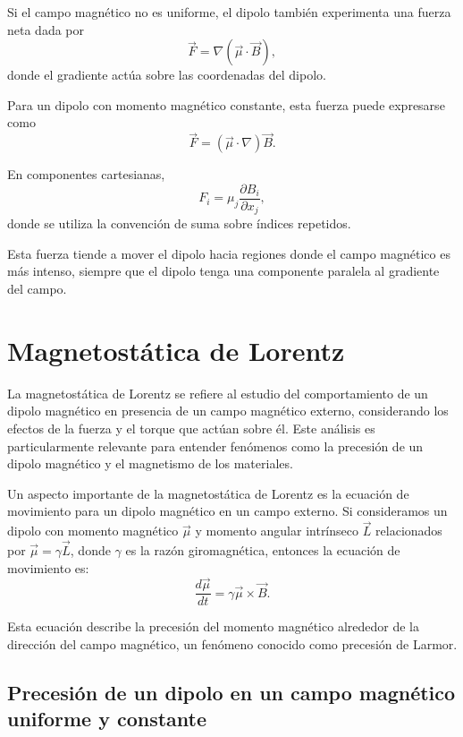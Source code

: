 \documentclass[12pt,a4paper]{book}
\begin{document}
Si el campo magnético no es uniforme, el dipolo también experimenta una fuerza neta dada por
\begin{equation}
\vec{F} = \nabla(\vec{\mu} \cdot \vec{B}),
\end{equation}
donde el gradiente actúa sobre las coordenadas del dipolo.

Para un dipolo con momento magnético constante, esta fuerza puede expresarse como
\begin{equation}
\vec{F} = (\vec{\mu} \cdot \nabla) \vec{B}.
\end{equation}

En componentes cartesianas,
\begin{equation}
F_i = \mu_j \frac{\partial B_i}{\partial x_j},
\end{equation}
donde se utiliza la convención de suma sobre índices repetidos.

Esta fuerza tiende a mover el dipolo hacia regiones donde el campo magnético es más intenso, siempre que el dipolo tenga una componente paralela al gradiente del campo.

\section{Magnetostática de Lorentz}

La magnetostática de Lorentz se refiere al estudio del comportamiento de un dipolo magnético en presencia de un campo magnético externo, considerando los efectos de la fuerza y el torque que actúan sobre él. Este análisis es particularmente relevante para entender fenómenos como la precesión de un dipolo magnético y el magnetismo de los materiales.

Un aspecto importante de la magnetostática de Lorentz es la ecuación de movimiento para un dipolo magnético en un campo externo. Si consideramos un dipolo con momento magnético $\vec{\mu}$ y momento angular intrínseco $\vec{L}$ relacionados por $\vec{\mu} = \gamma \vec{L}$, donde $\gamma$ es la razón giromagnética, entonces la ecuación de movimiento es:
\begin{equation}
\frac{d\vec{\mu}}{dt} = \gamma \vec{\mu} \times \vec{B}.
\end{equation}

Esta ecuación describe la precesión del momento magnético alrededor de la dirección del campo magnético, un fenómeno conocido como precesión de Larmor.

\subsection{Precesión de un dipolo en un campo magnético uniforme y constante}
\end{document}
